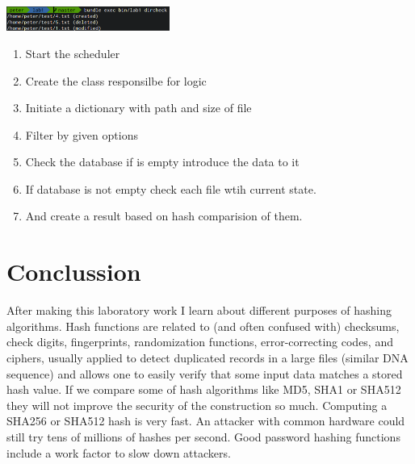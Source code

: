 \documentclass{article}
\begin{document}
  \vspace{0.5cm}

  \begin{minipage}[b]{1.0\linewidth}
    \begin{center}
      \includegraphics[width=0.4\textwidth]{dircheck1}
    \end{center}
  \end{minipage}


  \begin{enumerate}
  	\item Start the scheduler
  	\item Create the class responsilbe for logic
  	\item Initiate a dictionary with path and size of file
  	\item Filter by given options
  	\item Check the database if is empty introduce the data to it
  	\item If database is not empty check each file wtih current state.
  	\item And create a result based on hash comparision of them.
  \end{enumerate}


 \section{Conclussion}

	After making this laboratory work I learn about different purposes of hashing algorithms. Hash functions are related to
	(and often confused with) checksums, check digits, fingerprints, randomization functions, error-correcting codes, and ciphers,
	usually applied to detect duplicated records in a large files (similar DNA sequence) and allows one to easily verify that some
	input data matches a stored hash value. If we compare some of hash algorithms like MD5, SHA1 or SHA512 they will not improve the security of the construction so much. Computing a SHA256 or SHA512 hash is very fast. An attacker with common hardware could still try tens of millions of hashes per second. Good password hashing functions include a work factor to slow down attackers.
\end{document}
